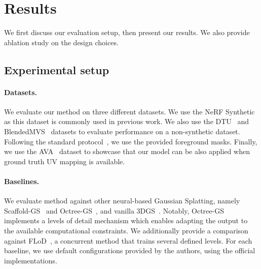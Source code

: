 



\section{Results}
  \label{sec:clog-result}

  We first discuss our evaluation setup, then present our results.
  We also provide ablation study on the design choices.

  \subsection{Experimental setup}
    \paragraph{Datasets.}
      We evaluate our method on three different datasets.
      We use the NeRF Synthetic~\cite{mildenhall2020nerf} as this dataset is
      commonly used in previous work.
      We also use the DTU~\cite{aanaes2016large} and
      BlendedMVS~\cite{yao2020blendedmvs} datasets to evaluate performance on a
      non-synthetic dataset.
      Following the standard protocol~\cite{ren2024octree}, we use the provided
      foreground masks.
      Finally, we use the AVA~\cite{martinez2024codec} dataset to showcase that our
      model can be also applied when ground truth UV mapping is available.

    \paragraph{Baselines.}
      We evaluate method against other neural-based Gaussian Splatting, namely
      Scaffold-GS~\cite{lu2024scaffold} and Octree-GS~\cite{ren2024octree}, and
      vanilla 3DGS~\cite{kerbl20233d}.
      Notably, Octree-GS implements a levels of detail mechanism which enables
      adapting the output to the available computational constraints.
      We additionally provide a comparison against FLoD~\cite{seo2024flod}, a
      concurrent method that trains several defined levels.
      For each baseline, we use default configurations provided by the authors,
      using the official implementations.


